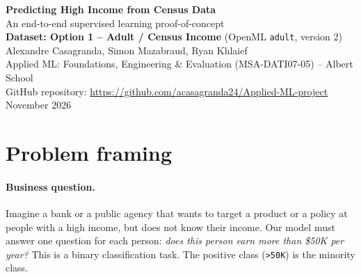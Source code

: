 \documentclass[11pt,a4paper]{article}
\begin{document}
\begin{center}
  {\LARGE \textbf{Predicting High Income from Census Data}}\\[4pt]
  {\large An end-to-end supervised learning proof-of-concept}\\[10pt]
  \textbf{Dataset: Option 1 -- Adult / Census Income} (OpenML \texttt{adult}, version 2)\\[6pt]
  Alexandre Casagranda, Simon Mazabraud, Ryan Khlaief\\[2pt]
  Applied ML: Foundations, Engineering \& Evaluation (MSA-DATI07-05) -- Albert School\\[2pt]
  GitHub repository: \url{https://github.com/acasagranda24/Applied-ML-project}\\[2pt]
  November 2026
\end{center}

\begin{abstract}
\noindent We predict whether an adult earns more than \$50K per year from the 1994 US census (48{,}842 people, 23.9\% positives).
All decisions are taken with 5-fold stratified cross-validation on an 80\% development set, and a 20\% test set is used only once at the end.
We compare four models of increasing flexibility: logistic regression, a decision tree, a random forest and LightGBM.
After tuning with Optuna, LightGBM is the best model (cross-validated PR-AUC $0.830 \pm 0.007$).
On the test set it reaches a PR-AUC of 0.837 and, with a decision threshold of 0.379 tuned on out-of-fold predictions, an F1 score of 0.728.
Its probabilities are well calibrated (Brier score 0.086, ECE 0.007).
SHAP shows that the model mainly uses capital income, age, marital status and education, which makes business sense.
Finally, a fairness audit by sex shows a recall gap of 7.5 points between men and women.
Group-specific decision thresholds close this gap: after mitigation it is no longer statistically distinguishable from zero, with almost no loss in overall performance.
\end{abstract}

\section{Problem framing}
\label{sec:framing}

\paragraph{Business question.}
Imagine a bank or a public agency that wants to target a product or a policy at people with a high income, but does not know their income.
Our model must answer one question for each person: \emph{does this person earn more than \$50K per year?}
This is a binary classification task. The positive class (\texttt{>50K}) is the minority class.
\end{document}
